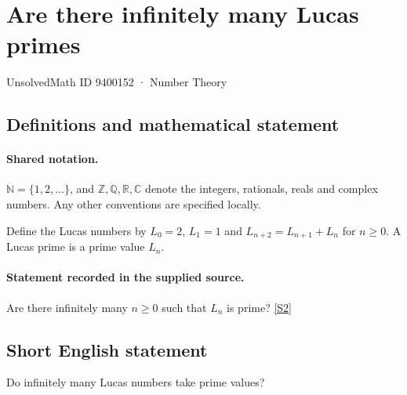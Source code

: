 \documentclass[11pt]{article}
\newcommand{\sref}[2]{\hyperlink{source:#1:#2}{[S#2]}}
\begin{document}
\setcounter{section}{9400151}
\section{Are there infinitely many Lucas primes}\label{9400152}
{\small\sffamily UnsolvedMath ID 9400152 · Number Theory}
\subsection{Definitions and mathematical statement}

\paragraph{Shared notation.}$\mathbb N=\{1,2,\ldots\}$, and $\mathbb Z,\mathbb Q,\mathbb R,\mathbb C$ denote the integers, rationals, reals and complex numbers. Any other conventions are specified locally.


Define the Lucas numbers by $L_0=2$, $L_1=1$ and $L_{n+2}=L_{n+1}+L_n$ for $n\ge0$. A Lucas prime is a prime value $L_n$.
\paragraph{Statement recorded in the supplied source.}
Are there infinitely many $n\ge0$ such that $L_n$ is prime? \sref{9400152}{2}
\subsection{Short English statement}
Do infinitely many Lucas numbers take prime values?
\end{document}
